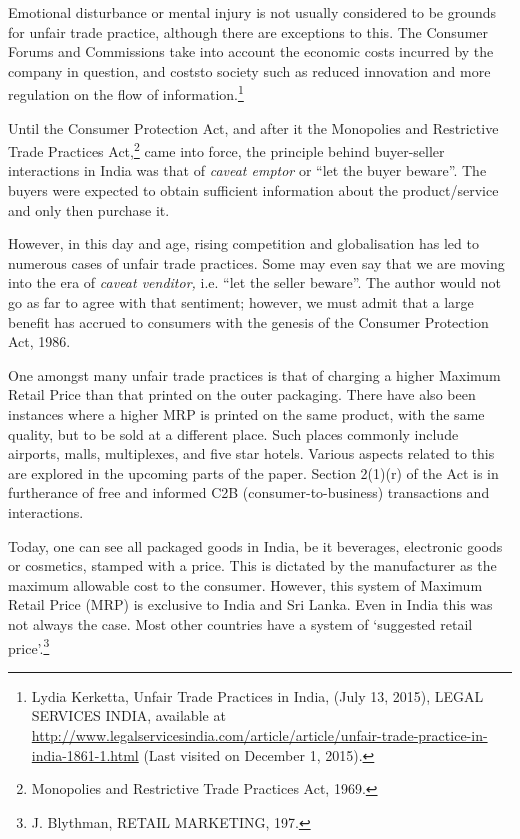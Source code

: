 \begin{multicols}{2}
\vspace{-.15cm}

\noi
Emotional disturbance or mental injury is not usually considered to be grounds for unfair trade
practice, although there are exceptions to this. The Consumer Forums and Commissions take
into account the economic costs incurred by the company in question, and coststo society such
as reduced innovation and more regulation on the flow of information.\footnote{Lydia Kerketta, Unfair Trade Practices in India, (July 13, 2015), LEGAL SERVICES INDIA, available at  \url{http://www.legalservicesindia.com/article/article/unfair-trade-practice-in-india-1861-1.html} (Last visited on
December 1, 2015).}

\noi
Until the Consumer Protection Act, and after it the Monopolies and Restrictive Trade Practices Act,\footnote{Monopolies and Restrictive Trade Practices Act, 1969.} came into force, the principle behind buyer-seller interactions in India was that of \textit{caveat emptor} or “let the buyer beware”. The buyers were expected to obtain sufficient information about the product/service and only then purchase it.

\noi
However, in this day and age, rising competition and globalisation has led to numerous cases
of unfair trade practices. Some may even say that we are moving into the era of \textit{caveat venditor,}
i.e. “let the seller beware”. The author would not go as far to agree with that sentiment;
however, we must admit that a large benefit has accrued to consumers with the genesis of the
Consumer Protection Act, 1986.

\noi
One amongst many unfair trade practices is that of charging a higher Maximum Retail Price
than that printed on the outer packaging. There have also been instances where a higher MRP
is printed on the same product, with the same quality, but to be sold at a different place. Such
places commonly include airports, malls, multiplexes, and five star hotels. Various aspects related to this are explored in the upcoming parts of the paper. Section 2(1)(r) of the Act is in
furtherance of free and informed C2B (consumer-to-business) transactions and interactions.

\vspace{-.1cm}


\vspace{-.15cm}

\noi
Today, one can see all packaged goods in India, be it beverages, electronic goods or cosmetics,
stamped with a price. This is dictated by the manufacturer as the maximum allowable cost to
the consumer. However, this system of Maximum Retail Price (MRP) is exclusive to India and
Sri Lanka. Even in India this was not always the case. Most other countries have a system of
‘suggested retail price’.\footnote{J. Blythman, RETAIL MARKETING, 197.}


\end{multicols}
